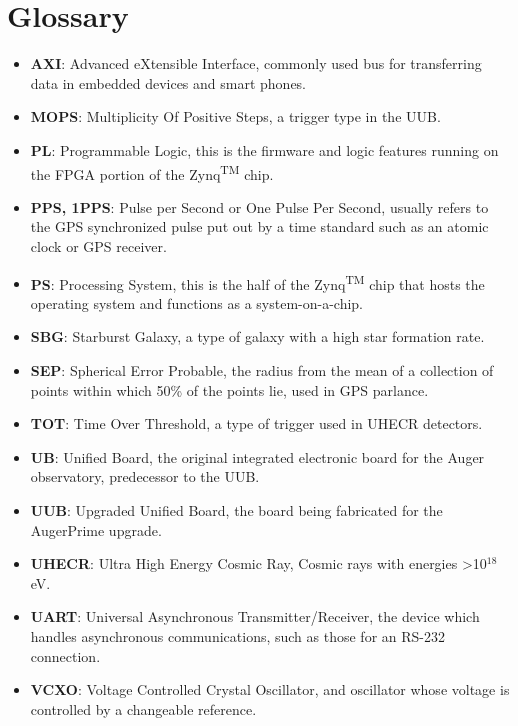 \chapter{Glossary}\label{glossary}
\begin{itemize}
\item \textbf{AXI}: Advanced eXtensible Interface, commonly used bus for transferring data in embedded devices and smart phones.

\item \textbf{MOPS}: Multiplicity Of Positive Steps, a trigger type in the UUB.

\item \textbf{PL}: Programmable Logic, this is the firmware and logic features running on the FPGA portion of the Zynq\textsuperscript{TM} chip.

\item \textbf{PPS, 1PPS}: Pulse per Second or One Pulse Per Second, usually refers to the GPS synchronized pulse put out by a time standard such as an atomic clock or GPS receiver.

\item \textbf{PS}: Processing System, this is the half of the Zynq\textsuperscript{TM} chip that hosts the operating system and functions as a system-on-a-chip.

\item \textbf{SBG}: Starburst Galaxy, a type of galaxy with a high star formation rate.

\item \textbf{SEP}: Spherical Error Probable, the radius from the mean of a collection of points within which 50\% of the points lie, used in GPS parlance.

\item \textbf{TOT}: Time Over Threshold, a type of trigger used in UHECR detectors.

\item \textbf{UB}: Unified Board, the original integrated electronic board for the Auger observatory, predecessor to the UUB.

\item \textbf{UUB}: Upgraded Unified Board, the board being fabricated for the AugerPrime upgrade. 

\item \textbf{UHECR}: Ultra High Energy Cosmic Ray, Cosmic rays with energies \textgreater 10$^{18}$ eV.

\item \textbf{UART}: Universal Asynchronous Transmitter/Receiver, the device which handles asynchronous communications, such as those for an RS-232 connection.

\item \textbf{VCXO}: Voltage Controlled Crystal Oscillator, and oscillator whose voltage is controlled by a changeable reference.
\end{itemize}

